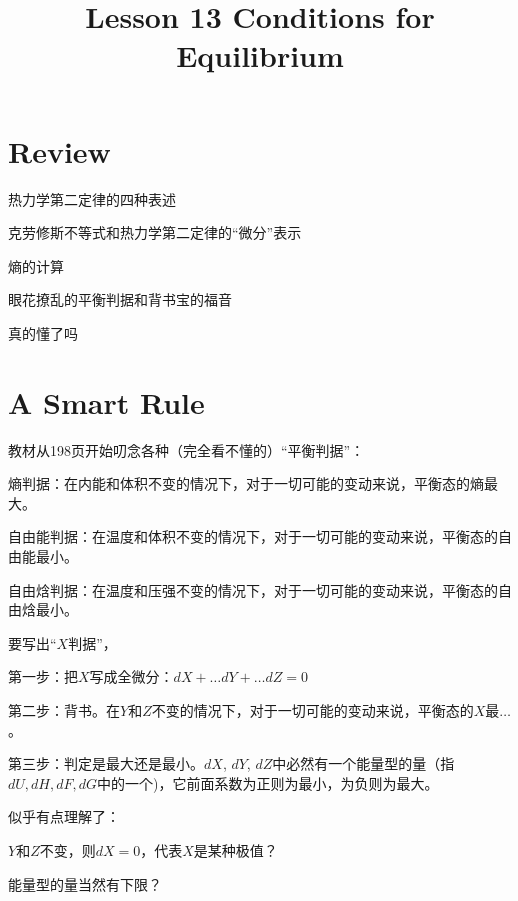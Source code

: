 \documentclass[CJK]{beamer}
\title{Lesson 13 Conditions for Equilibrium }
\author{}
\date{}
\begin{document}

\section{Review}

\begin{frame}
\bch 
\bitem
\item{热力学第二定律的四种表述}
\item{克劳修斯不等式和热力学第二定律的“微分”表示}
\item{熵的计算}
\eitem
\ech
\end{frame}

\begin{frame}
\bch
\bitem
\item{眼花撩乱的平衡判据和背书宝的福音}
\item{真的懂了吗}
\eitem
\ech
\end{frame}


\section{A Smart Rule}

\begin{frame}
\bch
教材从198页开始叨念各种（完全看不懂的）“平衡判据”：

\bitem
\item{熵判据：在内能和体积不变的情况下，对于一切可能的变动来说，平衡态的熵最大。}
\item{自由能判据：在温度和体积不变的情况下，对于一切可能的变动来说，平衡态的自由能最小。}
\item{自由焓判据：在温度和压强不变的情况下，对于一切可能的变动来说，平衡态的自由焓最小。}
\eitem

\ech
\end{frame}

\begin{frame}
\bch
{}

要写出“$X$判据”，

\bitem
\item{第一步：把$X$写成全微分：$dX + \ldots dY + \ldots dZ = 0$}
\item{第二步：背书。在$Y$和$Z$不变的情况下，对于一切可能的变动来说，平衡态的$X$最$\ldots$。}
\item{第三步：判定是最大还是最小。$dX$, $dY$, $dZ$中必然有一个能量型的量（指$dU, dH, dF, dG$中的一个)，它前面系数为正则为最小，为负则为最大。}
\eitem

{\scriptsize
似乎有点理解了：

$Y$和$Z$不变，则$dX = 0$，代表$X$是某种极值？

能量型的量当然有下限？
}
\ech
\end{frame}
\end{document}
